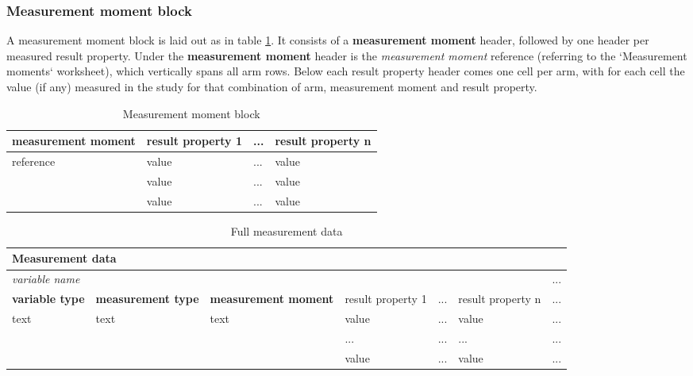 \documentclass[a4paper,10pt]{article}
\begin{document}
\subsubsection{Measurement moment block}
A measurement moment block is laid out as in table \ref{table:Measurement moment block}. It consists of a \textbf{measurement moment} header, followed by one header per measured result property. Under the \textbf{measurement moment} header is the \textit{measurement moment} reference (referring to the `Measurement moments` worksheet), which vertically spans all arm rows. Below each result property header comes one cell per arm, with for each cell the value (if any) measured in the study for that combination of arm, measurement moment and result property.

\begin{table}[h!]
  \centering
  \caption{Measurement moment block}
  \small
  \label{table:Measurement moment block}
  \begin{tabular}{|l|l|l|l|}
    \hline
    \textbf{measurement moment} & result property 1 &  ... & result property n \\ \hline
    \multirow{3}{*}{reference} & value & ... & value    \\  \cline{2-4}
                               & value & ... & value    \\  \cline{2-4}
                               & value & ... & value    \\  \cline{2-4}
    \hline
  \end{tabular}
\end{table}

\begin{table}[h!]
  \centering
  \caption{Full measurement data}
  \small
  \label{table:Full measurement data}
  \begin{tabular}{|l|l|l|l|l|l|l|}
    \hline
    \multicolumn{7}{|l|}{\textbf{Measurement data}}  \\ \hline
    \multicolumn{6}{|l|}{\textit{variable name}}  & ...  \\ \hline
    \textbf{variable type} &\textbf{ measurement type} & \textbf{measurement moment} & result property 1 &  ... & result property n & ...\\ \hline
    text & text & text & value & ... & value       & ... \\  \cline{4-6} 
         &      &      & ...   & ... & ...        & ...  \\  \cline{4-6} 
         &      &      & value & ... & value      & ...  \\ \hline
  \end{tabular}
\end{table}
\end{document}
